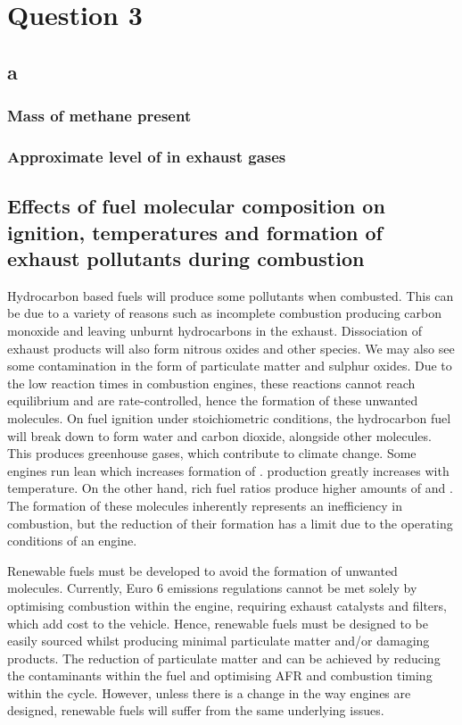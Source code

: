 \documentclass[11pt]{article}
\numberwithin{equation}{section}
\begin{document}
\section{Question 3}
\subsection{a}
\subsubsection{Mass of methane present}
\subsubsection{Approximate level of  in exhaust gases}
\subsection{Effects of fuel molecular composition on ignition, temperatures and formation of exhaust pollutants during combustion}
Hydrocarbon based fuels will produce some pollutants when combusted. This can be due to a variety of reasons such as incomplete combustion producing carbon monoxide and leaving unburnt hydrocarbons in the exhaust. Dissociation of exhaust products will also form nitrous oxides and other species. We may also see some contamination in the form of particulate matter and sulphur oxides. Due to the low reaction times in combustion engines, these reactions cannot reach equilibrium and are rate-controlled, hence the formation of these unwanted molecules. On fuel ignition under stoichiometric conditions, the hydrocarbon fuel will break down to form water and carbon dioxide, alongside other molecules. This produces greenhouse gases, which contribute to climate change. Some engines run lean which increases formation of .  production greatly increases with temperature. On the other hand, rich fuel ratios produce higher amounts of  and . The formation of these molecules inherently represents an inefficiency in combustion, but the reduction of their formation has a limit due to the operating conditions of an engine. 

Renewable fuels must be developed to avoid the formation of unwanted molecules. Currently, Euro 6 emissions regulations cannot be met solely by optimising combustion within the engine, requiring exhaust catalysts and filters, which add cost to the vehicle. Hence, renewable fuels must be designed to be easily sourced whilst producing minimal particulate matter and/or damaging products. The reduction of particulate matter and  can be achieved by reducing the contaminants within the fuel and optimising AFR and combustion timing within the cycle. However, unless there is a change in the way engines are designed, renewable fuels will suffer from the same underlying issues. 
\end{document}
